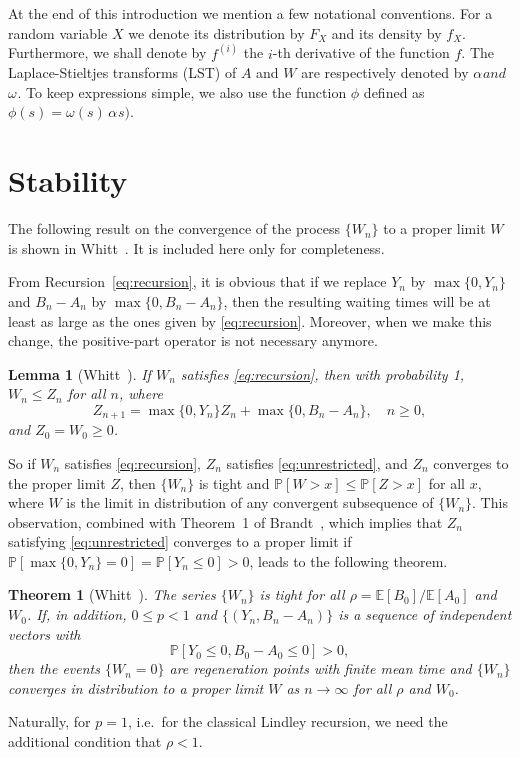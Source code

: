 \documentclass[reqno, 11pt, a4paper]{article}
\theoremstyle{plain}
\newtheorem{theorem}{Theorem}
\newtheorem{lemma}{Lemma}
\theoremstyle{remark}
\numberwithin{equation}{section}
\begin{document}
At the end of this introduction we mention a few notational conventions. For a random variable $X$ we denote its distribution by $F_X$ and its density by $f_X$. Furthermore, we shall denote by $f^{(i)}$ the $i$-th derivative of the function $f$. The Laplace-Stieltjes transforms (LST) of $A$ and $W$ are respectively denoted by ${\mbox{$\alpha^{}$}} and ${\mbox{$\omega^{}$}}. To keep expressions simple, we also use the function $\phi$ defined as $\phi(s)=\omega(s) \, {\mbox{$\alpha^{}$}}s)$.

\section{Stability}\label{s:model}
The following result on the convergence of the process $\{W_n\}$ to a proper limit $W$ is shown in Whitt~\cite{whitt90}. It is included here only for completeness.

From Recursion~\eqref{eq:recursion}, it is obvious that if we replace $Y_n$ by $\max\{0, Y_n\}$ and $B_n-A_n$ by $\max\{0, B_n-A_n\}$, then the resulting waiting times will be at least as large as the ones given by \eqref{eq:recursion}. Moreover, when we make this change, the positive-part operator is not necessary anymore.
\begin{lemma}[Whitt~]
If\/ $W_n$ satisfies \eqref{eq:recursion}, then with probability 1, $W_n\leqslant Z_n$ for all $n$, where
\begin{equation}\label{eq:unrestricted}
Z_{n+1}=\max\{0, Y_n\}Z_{n}+\max\{0, B_n-A_n\},\quad n\geqslant 0,
\end{equation}
and $Z_0=W_0\geqslant 0$.
\end{lemma}
So if $W_n$ satisfies \eqref{eq:recursion}, $Z_n$ satisfies \eqref{eq:unrestricted}, and $Z_n$ converges to the proper limit $Z$, then $\{W_n\}$ is tight and ${\mathbb{P}}[W>x]\leqslant{\mathbb{P}}[Z>x]$ for all $x$, where $W$ is the limit in distribution of any convergent subsequence of $\{W_n\}$. This observation, combined with Theorem~1 of Brandt~\cite{brandt86}, which implies that $Z_n$ satisfying \eqref{eq:unrestricted} converges to a proper limit if ${\mathbb{P}}[\max\{0, Y_n\}=0]={\mathbb{P}}[Y_n\leqslant 0]>0$, leads to the following theorem.
\begin{theorem}[Whitt~]\label{th:stability}
The series $\{W_n\}$ is tight for all $\rho={\mathbb{E}}[B_0]/{\mathbb{E}}[A_0]$ and $W_0$. If, in addition, $0\leqslant p<1$ and $\{(Y_n, B_n-A_n)\}$ is a sequence of independent vectors with $${\mathbb{P}}[Y_0\leqslant0, B_0-A_0\leqslant 0]>0,$$ then the events $\{W_n=0\}$ are regeneration points with finite mean time and $\{W_n\}$ converges in distribution to a proper limit $W$ as $n\to\infty$ for all $\rho$ and $W_0$.
\end{theorem}
Naturally, for $p=1$, i.e.\ for the classical Lindley recursion, we need the additional condition that $\rho <1$.
\end{document}
